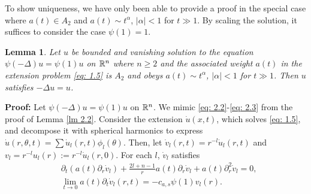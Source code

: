 \documentclass{article}
\newtheorem{lemma}[theorem]{Lemma}
\begin{document}
To show uniqueness, we have only been able to provide a proof in the special case where $a(t) \in A_2$ and $a(t) \sim t^{\alpha}$, $|\alpha|<1$ for $t\gg 1$. By scaling  the solution, it suffices to consider the case $\psi(1)=1$.

\begin{lemma}
\label{lm 5.2}
Let $u$ be bounded and vanishing solution to the  equation $\psi(-\Delta) u = \psi (1) u$ on $\mathbb{R}^n$ where $n \ge 2$ and the associated weight $a(t)$ in the extension problem \eqref{eq: 1.5} is $A_2$ and obeys $a(t) \sim t^{\alpha}$, $|\alpha|<1$ for $t\gg 1$. Then $u$ satisfies $ -\Delta u=  u $.
\end{lemma}

\noindent
\textbf{Proof:} Let $\psi(-\Delta)u = \psi (1) u$ on $\mathbb{R}^n$. We mimic \eqref{eq: 2.2}-\eqref{eq: 2.3} from the proof of Lemma \ref{lm 2.2}. Consider the extension $\dot{u}(x,t)$, which solves \eqref{eq: 1.5}, and decompose it with spherical harmonics to express $\dot{u}(r, \theta,t) = \sum \dot{u}_l(r,t)\phi_{l}(\theta)$. Then, let $\dot{v}_l(r,t) = r^{-l} \dot{u}_l(r,t)$ and $v_l = r^{-l} u_l(r) := r^{-l} \dot{u}_l(r,0)$. For each $l$, $\dot{v}_l$ satisfies
\begin{align*}
     &\partial_t(a(t) \partial_r \dot{v}_l) + \frac{2l+n-1}{r}a(t)\partial_r \dot{v}_l+a(t) \partial_r^2 \dot{v}_l = 0,\\
     & \lim_{t \to 0} a(t) \partial_t  \dot{v}_l(r,t) = -c_{a,s}\psi (1) v_l(r).
\tag{5.3} \label{eq: 5.3}
\end{align*}
\end{document}

